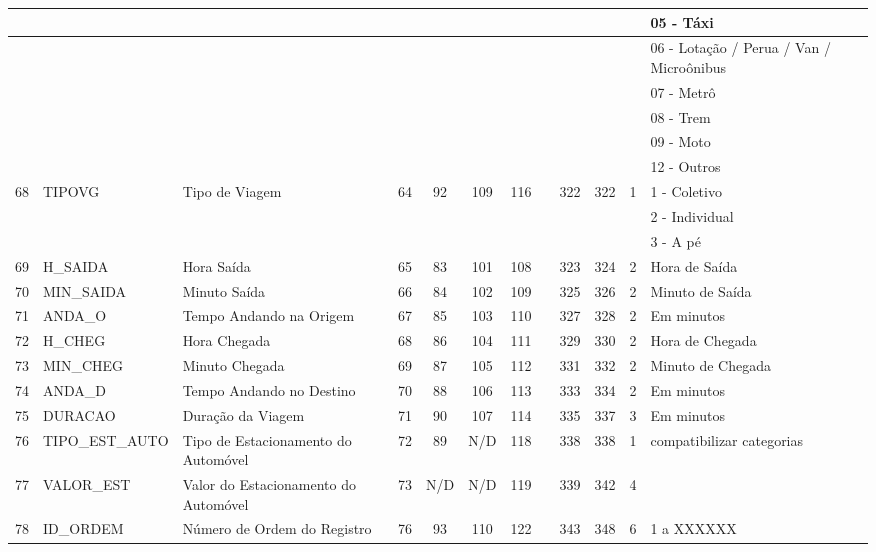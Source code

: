 \begin{table}[htbp]
\begin{center}
\begin{tabular}{|p{1cm}|l|l|c|c|c|c|c|c|c|c|l|}
 &  &  &  &  &  &  &  &  &  &  & 05 - Táxi \\ \hline
 &  &  &  &  &  &  &  &  &  &  & 06 - Lotação / Perua / Van / Microônibus \\ \hline
 &  &  &  &  &  &  &  &  &  &  & 07 - Metrô \\ \hline
 &  &  &  &  &  &  &  &  &  &  & 08 - Trem \\ \hline
 &  &  &  &  &  &  &  &  &  &  & 09 - Moto \\ \hline
 &  &  &  &  &  &  &  &  &  &  & 12 - Outros \\ \hline
68 & TIPOVG & Tipo de Viagem  & 64 & 92 & 109 & 116 &  & 322 & 322 & 1 & 1 - Coletivo \\ \hline
 &  &  &  &  &  &  &  &  &  &  & 2 - Individual \\ \hline
 &  &  &  &  &  &  &  &  &  &  & 3 - A pé \\ \hline
69 & H\_SAIDA & Hora Saída & 65 & 83 & 101 & 108 &  & 323 & 324 & 2 & Hora de Saída \\ \hline
70 & MIN\_SAIDA & Minuto Saída & 66 & 84 & 102 & 109 &  & 325 & 326 & 2 & Minuto de Saída \\ \hline
71 & ANDA\_O & Tempo Andando na Origem & 67 & 85 & 103 & 110 &  & 327 & 328 & 2 & Em minutos \\ \hline
72 & H\_CHEG & Hora Chegada & 68 & 86 & 104 & 111 &  & 329 & 330 & 2 & Hora de Chegada \\ \hline
73 & MIN\_CHEG & Minuto Chegada & 69 & 87 & 105 & 112 &  & 331 & 332 & 2 & Minuto de Chegada \\ \hline
74 & ANDA\_D & Tempo Andando no Destino & 70 & 88 & 106 & 113 &  & 333 & 334 & 2 & Em minutos \\ \hline
75 & DURACAO & Duração da Viagem & 71 & 90 & 107 & 114 &  & 335 & 337 & 3 & Em minutos \\ \hline
76 & TIPO\_EST\_AUTO & Tipo de Estacionamento do Automóvel & 72 & 89 & N/D & 118 &  & 338 & 338 & 1 & compatibilizar categorias \\ \hline
77 & VALOR\_EST & Valor do Estacionamento do Automóvel & 73 & N/D & N/D & 119 &  & 339 & 342 & 4 &  \\ \hline
78 & ID\_ORDEM & Número de Ordem do Registro & 76 & 93 & 110 & 122 &  & 343 & 348 & 6 & 1 a XXXXXX \\ \hline
\end{tabular}
\end{center}
\label{label}
\end{table}

